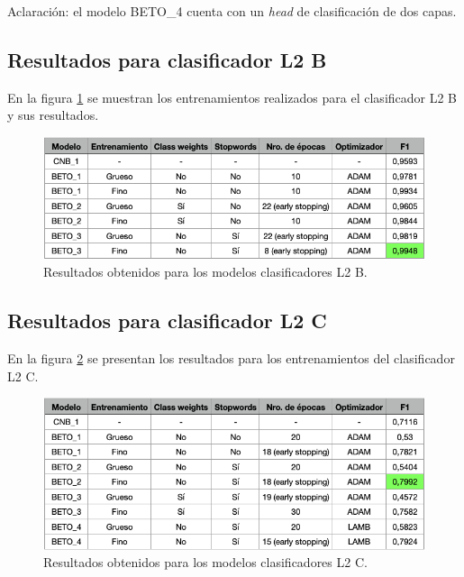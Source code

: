 Aclaración: el modelo BETO\_4 cuenta con un \textit{head} de clasificación de dos capas.

\subsection{Resultados para clasificador L2 B}

En la figura \ref{fig:res-l2b} se muestran los entrenamientos realizados para el clasificador L2 B y sus resultados.

\begin{figure}[htbp]
	\centering
	\includegraphics[width=1\textwidth]{./Figures/cap4-resultados-l2b.png}
	\caption{Resultados obtenidos para los modelos clasificadores L2 B.}
	\label{fig:res-l2b}
\end{figure}

\newpage

\subsection{Resultados para clasificador L2 C}

En la figura \ref{fig:res-l2c} se presentan los resultados para los entrenamientos del clasificador L2 C.

\begin{figure}[H]
	\centering
	\includegraphics[width=1\textwidth]{./Figures/cap4-resultados-l2c.png}
	\caption{Resultados obtenidos para los modelos clasificadores L2 C.}
	\label{fig:res-l2c}
\end{figure}

